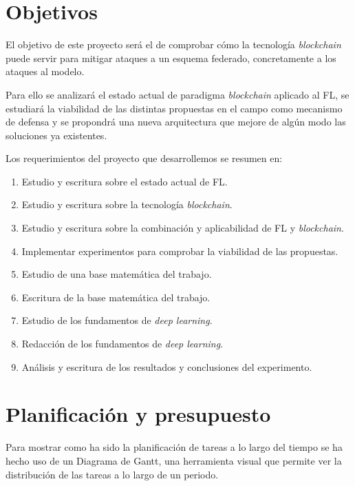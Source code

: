 \chapter{Objetivos}
El objetivo de este proyecto será el de comprobar cómo la tecnología \textit{blockchain} puede servir para mitigar ataques a un esquema federado, concretamente a los ataques al modelo.

Para ello se analizará el estado actual de paradigma \textit{blockchain} aplicado al \ac{FL}, se estudiará la viabilidad de las distintas propuestas en el campo como mecanismo de defensa y se propondrá una nueva arquitectura que mejore de algún modo las soluciones ya existentes.

Los requerimientos del proyecto que desarrollemos se resumen en:
\begin{enumerate}
    \item Estudio y escritura sobre el estado actual de \ac{FL}.
    \item Estudio y escritura sobre la tecnología \textit{blockchain}.
    \item Estudio y escritura sobre la combinación y aplicabilidad de \ac{FL} y \textit{blockchain}.
    \item Implementar experimentos para comprobar la viabilidad de las propuestas.
    \item Estudio de una base matemática del trabajo.
    \item Escritura de la base matemática del trabajo.
    \item Estudio de los fundamentos de \textit{deep learning}.
    \item Redacción de los fundamentos de \textit{deep learning}.
    \item Análisis y escritura de los resultados y conclusiones del experimento.
\end{enumerate}

\chapter{Planificación y presupuesto}
Para mostrar como ha sido la planificación de tareas a lo largo del tiempo se ha hecho uso de un Diagrama de Gantt, una herramienta visual que permite ver la distribución de las tareas a lo largo de un periodo.

